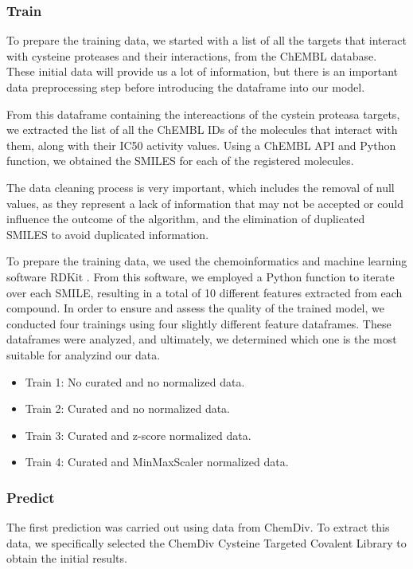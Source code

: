 \documentclass[final,times,twocolumn,article]{elsarticle}
\begin{document}
\subsubsection{Train}

To prepare the training data, we started with a list of all the targets that interact with cysteine proteases and their interactions, from the ChEMBL database. These initial data will provide us a lot of information, but there is an important data preprocessing step before introducing the dataframe into our model. 

From this dataframe containing the intereactions of the cystein proteasa targets, we extracted the list of all the ChEMBL IDs of the molecules that interact with them, along with their IC50 activity values. Using a ChEMBL API and Python function, we obtained the SMILES for each of the registered molecules. 

The data cleaning process is very important, which includes the removal of null values, as they represent a lack of information that may not be accepted or could influence the outcome of the algorithm, and the elimination of duplicated SMILES to avoid duplicated information. 

To prepare the training data, we used the chemoinformatics and machine learning software RDKit \cite{rdkitweb}. From this software, we employed a Python function to iterate over each SMILE, resulting in a total of 10 different features extracted from each compound. 
In order to ensure and assess the quality of the trained model, we conducted four trainings using four slightly different feature dataframes. These dataframes were analyzed, and ultimately, we determined which one is the most suitable for analyzind our data. 

\begin{itemize}
\item Train 1: No curated and no normalized data.
\item Train 2: Curated and no normalized data.
\item Train 3: Curated and z-score normalized data.
\item Train 4: Curated and MinMaxScaler normalized data.
\end{itemize}
\subsubsection{Predict}

The first prediction was carried out using data from ChemDiv. To extract this data, we specifically selected the ChemDiv Cysteine Targeted Covalent Library to obtain the initial results. 
\end{document}
